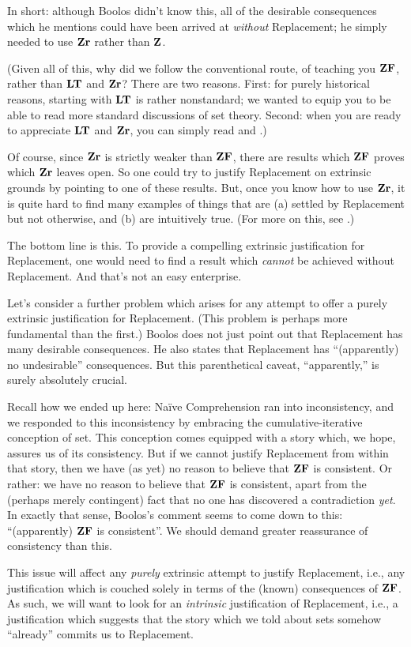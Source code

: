 \documentclass[../../../include/open-logic-section]{subfiles}
\begin{document}
In
short: although Boolos didn't know this, all of the desirable
consequences which he mentions could have been arrived at
\emph{without} Replacement; he simply needed to use $\mathbf{Zr}$ rather than $\mathbf{Z}$. 

(Given all of this, why did we follow the conventional route, of
teaching you $\mathbf{ZF}$, rather than $\mathbf{LT}$ and $\mathbf{Zr}$? There are two reasons. First: for purely historical reasons, starting with $\mathbf{LT}$ is rather nonstandard; we wanted to
equip you to be able to read more standard discussions of set theory. Second: when you are ready to
appreciate $\mathbf{LT}$ and $\mathbf{Zr}$, you can simply read \citealt{Potter2004} and \citealt{ButtonLT1}.)

Of course, since $\mathbf{Zr}$ is strictly weaker than $\mathbf{ZF}$, there are results which
$\mathbf{ZF}$ proves which $\mathbf{Zr}$ leaves open. So one could try to justify
Replacement on extrinsic grounds by pointing to one of these results.
But, once you know how to use $\mathbf{Zr}$, it is quite hard to find many
examples of things that are (a) settled by Replacement but not
otherwise, and (b) are intuitively true. (For more on this, see
\citealt[\S13.2]{Potter2004}.)

The bottom line is this. To provide a compelling extrinsic
justification for Replacement, one would need to find a result which
\emph{cannot} be achieved without Replacement. And that's not an easy
enterprise. 

Let's consider a further problem which arises for any attempt to offer
a purely extrinsic justification for Replacement. (This problem is
perhaps more fundamental than the first.) Boolos does not just point
out that Replacement has many desirable consequences. He also states
that Replacement has ``(apparently) no undesirable'' consequences. But
this parenthetical caveat, ``apparently,'' is surely absolutely
crucial.

Recall how we ended up here: Na\"ive Comprehension ran into
inconsistency, and we responded to this inconsistency by embracing the
cumulative-iterative conception of set. This conception comes equipped
with a story which, we hope, assures us of its consistency. But if we
cannot justify Replacement from within that story, then we have (as
yet) no reason to believe that $\mathbf{ZF}$ is consistent. Or rather: we have
no reason to believe that $\mathbf{ZF}$ is consistent, apart from the (perhaps
merely contingent) fact that no one has discovered a contradiction
\emph{yet}. In exactly that sense, Boolos's comment seems to come down
to this: ``(apparently) $\mathbf{ZF}$ is consistent''. We should demand
greater reassurance of consistency than this. 

This issue will affect any \emph{purely} extrinsic attempt to justify
Replacement, i.e., any justification which is couched solely in terms
of the (known) consequences of $\mathbf{ZF}$. As such, we will want to look
for an \emph{intrinsic} justification of Replacement, i.e., a
justification which suggests that the story which we told about sets
somehow ``already'' commits us to Replacement. 
\end{document}
